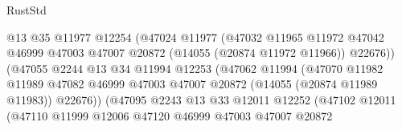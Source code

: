 \begin{lexlean}{RustStd}
\begin{coremodule}
                                        @13
                                        @35
                                        @11977
                                        @12254
                                        (@47024
                                          @11977
                                          (@47032
                                            @11965
                                            @11972
                                            @47042
                                            @46999
                                            @47003
                                            @47007
                                            @20872
                                            (@14055 (@20874 @11972 @11966))
                                            @22676))
                                        (@47055
                                          @2244
                                          @13
                                          @34
                                          @11994
                                          @12253
                                          (@47062
                                            @11994
                                            (@47070
                                              @11982
                                              @11989
                                              @47082
                                              @46999
                                              @47003
                                              @47007
                                              @20872
                                              (@14055 (@20874 @11989 @11983))
                                              @22676))
                                          (@47095
                                            @2243
                                            @13
                                            @33
                                            @12011
                                            @12252
                                            (@47102
                                              @12011
                                              (@47110
                                                @11999
                                                @12006
                                                @47120
                                                @46999
                                                @47003
                                                @47007
                                                @20872

\end{coremodule}
\end{lexlean}
